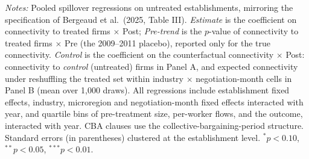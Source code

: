 \begin{table}[H]
\begin{minipage}{0.98\textwidth}\vspace{4pt}\scriptsize \textit{Notes:} Pooled spillover regressions on untreated establishments, mirroring the specification of Bergeaud et al.\ (2025, Table III). \emph{Estimate} is the coefficient on connectivity to treated firms $\times$ Post; \emph{Pre-trend} is the $p$-value of connectivity to treated firms $\times$ Pre (the 2009--2011 placebo), reported only for the true connectivity. \emph{Control} is the coefficient on the counterfactual connectivity $\times$ Post: connectivity to \emph{control} (untreated) firms in Panel A, and expected connectivity under reshuffling the treated set within industry $\times$ negotiation-month cells in Panel B (mean over 1{,}000 draws). All regressions include establishment fixed effects, industry, microregion and negotiation-month fixed effects interacted with year, and quartile bins of pre-treatment size, per-worker flows, and the outcome, interacted with year. CBA clauses use the collective-bargaining-period structure. Standard errors (in parentheses) clustered at the establishment level. $^{*}p<0.10$, $^{**}p<0.05$, $^{***}p<0.01$.\end{minipage}
\end{table}